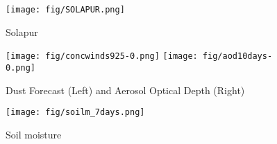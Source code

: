 \documentclass[10pt,a4paper]{article} %
\begin{document}
\begin{figure}[H]
\centering
\texttt{[image: fig/SOLAPUR.png]}\\
\caption{Solapur}
\end{figure}




\begin{figure}[H]
\centering
\texttt{[image: fig/concwinds925-0.png]}
\texttt{[image: fig/aod10days-0.png]}
\caption{Dust Forecast (Left) and Aerosol  Optical Depth (Right)}
\end{figure}





\begin{figure}[H]
\centering
\texttt{[image: fig/soilm\_7days.png]}
\caption{Soil moisture}
\end{figure}





\end{document}
